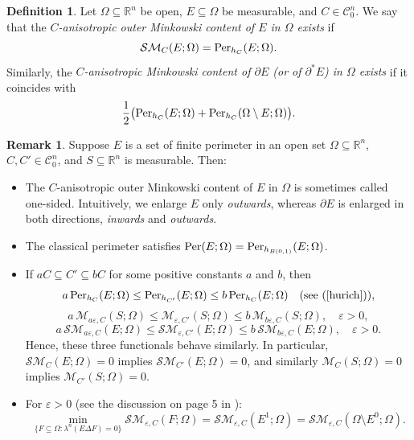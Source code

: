 \documentclass[pdflatex,sn-mathphys-num]{sn-jnl}
\theoremstyle{plain}
\theoremstyle{definition}
\newtheorem{definition}[theorem]{Definition}
\newtheorem{rem}[theorem]{Remark}
\DeclareMathOperator{\Per}{\textup{Per}}
\begin{document}
\begin{definition}
Let $\Omega\subseteq\mathbb{R}^n$ be open, $E\subseteq\Omega$ be measurable, and $C\in\mathcal{C}^n_0$. We say that the \textit{$C$-anisotropic outer Minkowski content of $E$ in $\Omega$ exists} if
\[
\mathcal{SM}_C(E;\Omega) = \textup{Per}_{h_C}(E;\Omega).
\]
Similarly, the \textit{$C$-anisotropic Minkowski content of $\partial E$ (or of $\partial^* E$) in $\Omega$ exists} if it coincides with
\[
\frac{1}{2}\big(\textup{Per}_{h_C}(E;\Omega) + \textup{Per}_{h_C}(\Omega\setminus E;\Omega)\big).
\]
\end{definition}

\begin{rem}\label{REMAk}
Suppose $E$ is a set of finite perimeter in an open set $\Omega\subseteq\mathbb{R}^n$, $C, C'\in\mathcal{C}^n_0$, and $S\subseteq\mathbb{R}^n$ is measurable. Then:
\begin{itemize}
    \item The $C$-anisotropic outer Minkowski content of $E$ in $\Omega$ is sometimes called one-sided. Intuitively, we enlarge $E$ only \emph{outwards}, whereas $\partial E$ is enlarged in both directions, \emph{inwards} and \emph{outwards}.
    \item The classical perimeter satisfies $\Per(E;\Omega) = \textup{Per}_{h_{B(0,1)}}(E;\Omega)$.
    \item If $a C\subseteq C'\subseteq b C$ for some positive constants $a$ and $b$, then
    \[
    a\,\textup{Per}_{h_C}(E;\Omega) \le \textup{Per}_{h_{C'}}(E;\Omega) \le b\,\textup{Per}_{h_C}(E;\Omega) \quad \text{(see (\ref{hurich}))},
    \]
    \[
    a\,\mathcal{M}_{a\varepsilon,C}(S;\Omega) \le \mathcal{M}_{\varepsilon,C'}(S;\Omega) \le b\,\mathcal{M}_{b\varepsilon,C}(S;\Omega), \quad \varepsilon>0,
    \]
    \[
    a\,\mathcal{SM}_{a\varepsilon,C}(E;\Omega) \le \mathcal{SM}_{\varepsilon,C'}(E;\Omega) \le b\,\mathcal{SM}_{b\varepsilon,C}(E;\Omega), \quad \varepsilon>0.
    \]
    Hence, these three functionals behave similarly. In particular, $\mathcal{SM}_C(E;\Omega)=0$ implies $\mathcal{SM}_{C'}(E;\Omega)=0$, and similarly $\mathcal{M}_C(S;\Omega)=0$ implies $\mathcal{M}_{C'}(S;\Omega)=0$.
    \item For $\varepsilon>0$ (see the discussion on page 5 in \cite{chambolle}):
    \begin{equation}\label{min4}
        \min_{\{F\subseteq \Omega : \lambda^n(E\Delta F)=0\}} \mathcal{SM}_{\varepsilon,C}(F;\Omega) = \mathcal{SM}_{\varepsilon,C}(E^1;\Omega) = \mathcal{SM}_{\varepsilon,C}(\Omega\setminus E^0;\Omega).

\end{equation}
\end{itemize}
\end{rem}
\end{document}
